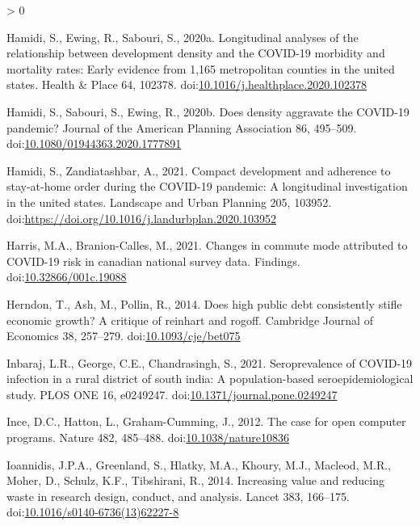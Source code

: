 \documentclass[]{elsarticle} %
\newlength{\cslhangindent}
\newenvironment{CSLReferences}[2] %
 {%
  \setlength{\parindent}{0pt}
  \ifodd #1 \everypar{\setlength{\hangindent}{\cslhangindent}}\ignorespaces\fi
  \ifnum #2 > 0
  \setlength{\parskip}{#2\baselineskip}
  \fi
 }%
 {}
\begin{document}
\begin{CSLReferences}{1}{0}
\leavevmode\hypertarget{ref-Hamidi2020longitudinal}{}%
Hamidi, S., Ewing, R., Sabouri, S., 2020a. Longitudinal analyses of the
relationship between development density and the COVID-19 morbidity and
mortality rates: Early evidence from 1,165 metropolitan counties in the
united states. Health \& Place 64, 102378.
doi:\href{https://doi.org/10.1016/j.healthplace.2020.102378}{10.1016/j.healthplace.2020.102378}

\leavevmode\hypertarget{ref-Hamidi2020density}{}%
Hamidi, S., Sabouri, S., Ewing, R., 2020b. Does density aggravate the
COVID-19 pandemic? Journal of the American Planning Association 86,
495--509.
doi:\href{https://doi.org/10.1080/01944363.2020.1777891}{10.1080/01944363.2020.1777891}

\leavevmode\hypertarget{ref-Hamidi2021compact}{}%
Hamidi, S., Zandiatashbar, A., 2021. Compact development and adherence
to stay-at-home order during the COVID-19 pandemic: A longitudinal
investigation in the united states. Landscape and Urban Planning 205,
103952. doi:\url{https://doi.org/10.1016/j.landurbplan.2020.103952}

\leavevmode\hypertarget{ref-Harris2021Changes}{}%
Harris, M.A., Branion-Calles, M., 2021. Changes in commute mode
attributed to COVID-19 risk in canadian national survey data. Findings.
doi:\href{https://doi.org/10.32866/001c.19088}{10.32866/001c.19088}

\leavevmode\hypertarget{ref-Herndon2014high}{}%
Herndon, T., Ash, M., Pollin, R., 2014. Does high public debt
consistently stifle economic growth? A critique of reinhart and rogoff.
Cambridge Journal of Economics 38, 257--279.
doi:\href{https://doi.org/10.1093/cje/bet075}{10.1093/cje/bet075}

\leavevmode\hypertarget{ref-Inbaraj2021seroprevalence}{}%
Inbaraj, L.R., George, C.E., Chandrasingh, S., 2021. Seroprevalence of
COVID-19 infection in a rural district of south india: A
population-based seroepidemiological study. PLOS ONE 16, e0249247.
doi:\href{https://doi.org/10.1371/journal.pone.0249247}{10.1371/journal.pone.0249247}

\leavevmode\hypertarget{ref-Ince2012case}{}%
Ince, D.C., Hatton, L., Graham-Cumming, J., 2012. The case for open
computer programs. Nature 482, 485--488.
doi:\href{https://doi.org/10.1038/nature10836}{10.1038/nature10836}

\leavevmode\hypertarget{ref-Ioannidis2014increasing}{}%
Ioannidis, J.P.A., Greenland, S., Hlatky, M.A., Khoury, M.J., Macleod,
M.R., Moher, D., Schulz, K.F., Tibshirani, R., 2014. Increasing value
and reducing waste in research design, conduct, and analysis. Lancet
383, 166--175.
doi:\href{https://doi.org/10.1016/s0140-6736(13)62227-8}{10.1016/s0140-6736(13)62227-8}


\end{CSLReferences}
\end{document}

